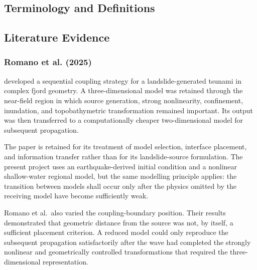 \subsection{Terminology and Definitions}
\label{sec:res-mod-mul-definitions}


\subsection{Literature Evidence}
\label{sec:res-mod-mul-literature-evidence}

%

\subsubsection{Romano et al. (2025)}
\label{sec:res-mod-mul-evidence-romano-2025}

\textcite{romano2025coupling} developed a sequential coupling strategy
for a landslide-generated tsunami in complex fjord geometry. A
three-dimensional model was retained through the near-field region in
which source generation, strong nonlinearity, confinement, inundation,
and topobathymetric transformation remained important. Its output was
then transferred to a computationally cheaper two-dimensional model for
subsequent propagation.

The paper is retained for its treatment of model selection, interface
placement, and information transfer rather than for its landslide-source
formulation. The present project uses an earthquake-derived initial
condition and a nonlinear shallow-water regional model, but the same
modelling principle applies: the transition between models shall occur
only after the physics omitted by the receiving model have become
sufficiently weak.

Romano et al.\ also varied the coupling-boundary position. Their results
demonstrated that geometric distance from the source was not, by itself,
a sufficient placement criterion. A reduced model could only reproduce
the subsequent propagation satisfactorily after the wave had completed
the strongly nonlinear and geometrically controlled transformations that
required the three-dimensional representation.


